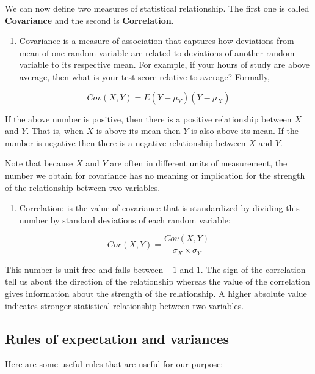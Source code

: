 \documentclass[
]{book}
\providecommand{\tightlist}{%
  \setlength{\itemsep}{0pt}\setlength{\parskip}{0pt}}
\theoremstyle{definition}
\theoremstyle{definition}
\theoremstyle{definition}
\theoremstyle{definition}
\theoremstyle{remark}
\begin{document}
We can now define two measures of statistical relationship. The first one is called \textbf{Covariance} and the second is \textbf{Correlation}.

\begin{enumerate}
\def\labelenumi{\arabic{enumi}.}
\tightlist
\item
  Covariance is a measure of association that captures how deviations from mean of one random variable are related to deviations of another random variable to its respective mean. For example, if your hours of study are above average, then what is your test score relative to average? Formally,
\end{enumerate}

\[Cov(X,Y) = E(Y-\mu_Y)(Y-\mu_X)\]

If the above number is positive, then there is a positive relationship between \(X\) and \(Y\). That is, when \(X\) is above its mean then \(Y\) is also above its mean. If the number is negative then there is a negative relationship between \(X\) and \(Y\).

Note that because \(X\) and \(Y\) are often in different units of measurement, the number we obtain for covariance has no meaning or implication for the strength of the relationship between two variables.

\begin{enumerate}
\def\labelenumi{\arabic{enumi}.}
\setcounter{enumi}{1}
\tightlist
\item
  Correlation: is the value of covariance that is standardized by dividing this number by standard deviations of each random variable:
\end{enumerate}

\[Cor(X,Y) = \frac{Cov(X,Y)}{\sigma_X \times \sigma_Y }\]

This number is unit free and falls between \(-1\) and \(1\). The sign of the correlation tell us about the direction of the relationship whereas the value of the correlation gives information about the strength of the relationship. A higher absolute value indicates stronger statistical relationship between two variables.

\hypertarget{rules-of-expectation-and-variances}{%
\subsection{Rules of expectation and variances}\label{rules-of-expectation-and-variances}}

Here are some useful rules that are useful for our purpose:
\end{document}
